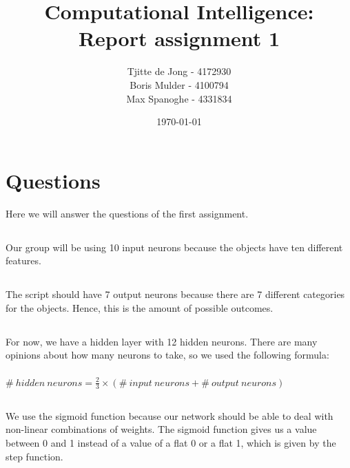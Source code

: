 \documentclass{scrartcl}
\begin{document}
\title{Computational Intelligence:
\\Report assignment 1}
\date{\today{}}

\author{
    \begin{tabular}{l r}
    	\\Tjitte de Jong - 4172930
	\\Boris Mulder - 4100794
        \\Max Spanoghe - 4331834
            \end{tabular}
  }
  
  \maketitle \thispagestyle{empty} \pagebreak
  
  \section{Questions}
  Here we will answer the questions of the first assignment.
  
  \subsection{}
  Our group will be using 10 input neurons because the objects have ten different features.
  
  \subsection{}
  The script should have 7 output neurons because there are 7 different categories for the objects.
  Hence, this is the amount of possible outcomes.
  
  \subsection{}
  For now, we have a hidden layer with 12 hidden neurons. There are many opinions about how many neurons to take, so we used the following formula: \\ \\ $\# \:hidden \:neurons = \frac{2} {3} \times (\# \:input \:neurons + \# \:output \:neurons) $
  
  \subsection{}
  We use the sigmoid function because our network should be able to deal with non-linear combinations of weights. The sigmoid function gives us a value between 0 and 1 instead of a value of a flat 0 or a flat 1, which is given by the step function.
  
\end{document}
